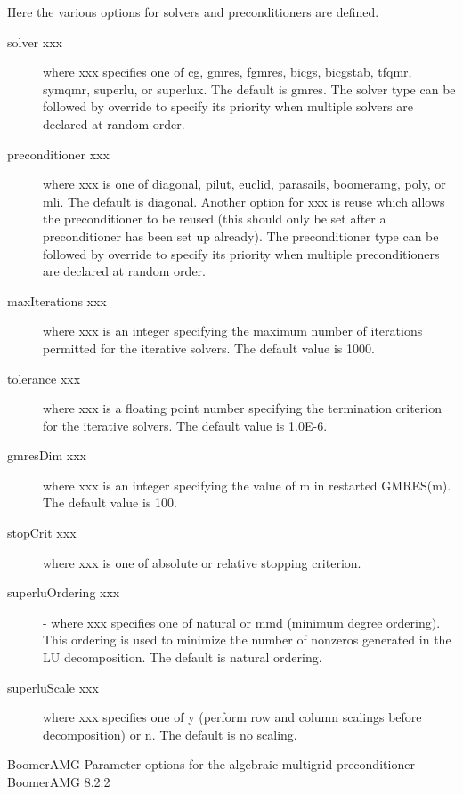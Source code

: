 \documentclass{article}
\begin{document}
\begin{cxxentry}
\begin{cxxentry}
\begin{cxxentry}
\begin{cxxdoc}
Here the various options for solvers and preconditioners
are defined.

\begin{description}
\item[solver xxx] where xxx specifies one of {\sf cg}, {\sf gmres},
{\sf fgmres}, {\sf bicgs}, {\sf bicgstab}, {\sf tfqmr}, 
{\sf symqmr}, {\sf superlu}, or {\sf superlux}.  The 
default is {\sf gmres}.
The solver type can be followed by {\sf override} to
specify its priority when multiple solvers are declared
at random order.
\item[preconditioner xxx] where xxx is one of {\sf diagonal}, {\sf pilut},
{\sf euclid}, {\sf parasails}, {\sf boomeramg}, {\sf poly}, or 
{\sf mli}. The default is {\sf diagonal}.  Another option for 
xxx is {\sf reuse} which allows the preconditioner to be reused 
(this should only be set after a preconditioner has been set 
up already).
The preconditioner type can be followed by {\sf override} to
specify its priority when multiple preconditioners are declared
at random order.
\item[maxIterations xxx] where xxx is an integer specifying the maximum 
number of iterations permitted for the iterative solvers.
The default value is 1000.
\item[tolerance xxx] where xxx is a floating point number specifying the 
termination criterion for the iterative solvers.  The default 
value is 1.0E-6.
\item[gmresDim xxx] where xxx is an integer specifying the value of m in
restarted GMRES(m).  The default value is 100.
\item[stopCrit xxx] where xxx is one of {\sf absolute} or {\sf relative}
stopping criterion.
\item[superluOrdering xxx] - where xxx specifies one of {\sf natural} or
{\sf mmd} (minimum degree ordering).  This ordering
is used to minimize the number of nonzeros generated
in the LU decomposition.  The default is natural ordering.
\item[superluScale xxx] where xxx specifies one of {\sf y} (perform row
and column scalings before decomposition) or {\sf n}.
The default is no scaling.
\end{description}
\end{cxxdoc}
\end{cxxentry}
\begin{cxxentry}
{}
        {BoomerAMG}
        {}
        {
Parameter options for the algebraic multigrid preconditioner BoomerAMG}
        {8.2.2}
\begin{cxxdoc}


\end{cxxdoc}
\end{cxxentry}
\end{cxxentry}
\end{cxxentry}
\end{document}

